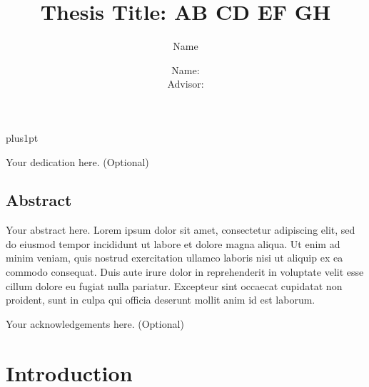 \documentclass{fulbrightthesis}
\title{ Thesis Title: AB CD EF GH }
\author{Name}
\author{Name:      \\ Advisor:  }             %
\begin{document}
\baselineskip=18pt plus1pt

\setcounter{secnumdepth}{3}
\setcounter{tocdepth}{3}


\maketitle                  %

\begin{dedication}
    Your dedication here. (Optional)
\end{dedication}


\begin{romanpages}          %
\tableofcontents            %
\newpage

\section*{Abstract}
Your abstract here. Lorem ipsum dolor sit amet, consectetur adipiscing elit, sed do eiusmod tempor incididunt ut labore et dolore magna aliqua. Ut enim ad minim veniam, quis nostrud exercitation ullamco laboris nisi ut aliquip ex ea commodo consequat. Duis aute irure dolor in reprehenderit in voluptate velit esse cillum dolore eu fugiat nulla pariatur. Excepteur sint occaecat cupidatat non proident, sunt in culpa qui officia deserunt mollit anim id est laborum.


\begin{acknowledgements}
Your acknowledgements here. (Optional)
\end{acknowledgements}

\listoftables               %

\newpage
\listoffigures              %
\end{romanpages}            %

\section{Introduction}
\end{document}

